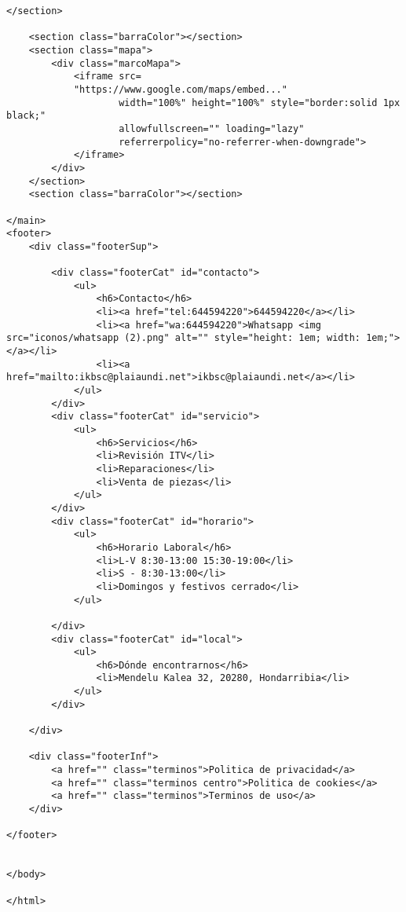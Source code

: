 \begin{lstlisting}[caption=location.html (LMSI)]
    </section>

    <section class="barraColor"></section>
    <section class="mapa">
        <div class="marcoMapa">
            <iframe src=
            "https://www.google.com/maps/embed..."
                    width="100%" height="100%" style="border:solid 1px black;" 
                    allowfullscreen="" loading="lazy" 
                    referrerpolicy="no-referrer-when-downgrade">
            </iframe>
        </div>
    </section>
    <section class="barraColor"></section>

</main>
<footer>
    <div class="footerSup">

        <div class="footerCat" id="contacto">
            <ul>
                <h6>Contacto</h6>
                <li><a href="tel:644594220">644594220</a></li>
                <li><a href="wa:644594220">Whatsapp <img src="iconos/whatsapp (2).png" alt="" style="height: 1em; width: 1em;"></a></li>
                <li><a href="mailto:ikbsc@plaiaundi.net">ikbsc@plaiaundi.net</a></li>
            </ul>
        </div>
        <div class="footerCat" id="servicio">
            <ul>
                <h6>Servicios</h6>
                <li>Revisión ITV</li>
                <li>Reparaciones</li>
                <li>Venta de piezas</li>
            </ul>
        </div>
        <div class="footerCat" id="horario">
            <ul>
                <h6>Horario Laboral</h6>
                <li>L-V 8:30-13:00 15:30-19:00</li>
                <li>S - 8:30-13:00</li>
                <li>Domingos y festivos cerrado</li>
            </ul>

        </div>
        <div class="footerCat" id="local">
            <ul>
                <h6>Dónde encontrarnos</h6>
                <li>Mendelu Kalea 32, 20280, Hondarribia</li>
            </ul>
        </div>

    </div>

    <div class="footerInf">
        <a href="" class="terminos">Politica de privacidad</a>
        <a href="" class="terminos centro">Politica de cookies</a>
        <a href="" class="terminos">Terminos de uso</a>
    </div>

</footer>


</body>

</html>
\end{lstlisting}
\clearpage
